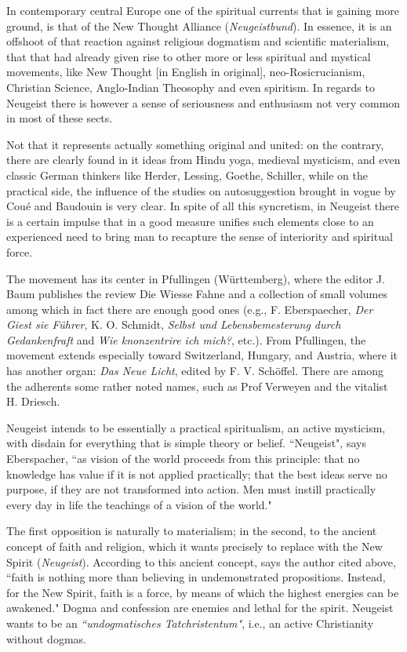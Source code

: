 \begin{quotationx}
\end{quotationx}

In contemporary central Europe one of the spiritual currents that is gaining more ground, is that of the New Thought Alliance (\textit{Neugeistbund}). In essence, it is an offshoot of that reaction against religious dogmatism and scientific materialism, that that had already given rise to other more or less spiritual and mystical movements, like New Thought [in English in original], neo-Rosicrucianism, Christian Science, Anglo-Indian Theosophy and even spiritism. In regards to Neugeist there is however a sense of seriousness and enthusiasm not very common in most of these sects.

Not that it represents actually something original and united: on the contrary, there are clearly found in it ideas from Hindu yoga, medieval mysticism, and even classic German thinkers like Herder, Lessing, Goethe, Schiller, while on the practical side, the influence of the studies on autosuggestion brought in vogue by Coué and Baudouin is very clear. In spite of all this syncretism, in Neugeist there is a certain impulse that in a good measure unifies such elements close to an experienced need to bring man to recapture the sense of interiority and spiritual force.

The movement has its center in Pfullingen (Württemberg), where the editor J. Baum publishes the review Die Wiesse Fahne and a collection of small volumes among which in fact there are enough good ones (e.g., F. Eberspaecher, \textit{Der Giest sie Führer}, K. O. Schmidt, \textit{Selbst und Lebensbemesterung durch Gedankenfraft} and \textit{Wie knonzentrire ich mich?}, etc.). From Pfullingen, the movement extends especially toward Switzerland, Hungary, and Austria, where it has another organ: \textit{Das Neue Licht}, edited by F. V. Schöffel. There are among the adherents some rather noted names, such as Prof Verweyen and the vitalist H. Driesch.

Neugeist intends to be essentially a practical spiritualism, an active mysticism, with disdain for everything that is simple theory or belief. ``Neugeist", says Eberspacher, ``as vision of the world proceeds from this principle: that no knowledge has value if it is not applied practically; that the best ideas serve no purpose, if they are not transformed into action. Men must instill practically every day in life the teachings of a vision of the world."

The first opposition is naturally to materialism; in the second, to the ancient concept of faith and religion, which it wants precisely to replace with the New Spirit (\textit{Neugeist}). According to this ancient concept, says the author cited above, ``faith is nothing more than believing in undemonstrated propositions. Instead, for the New Spirit, faith is a force, by means of which the highest energies can be awakened." Dogma and confession are enemies and lethal for the spirit. Neugeist wants to be an \textit{``undogmatisches Tatchristentum"}, i.e., an active Christianity without dogmas.

